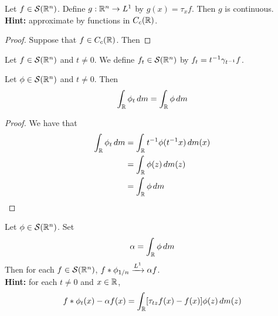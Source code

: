 \documentclass{book}
\begin{document}
	\begin{ex}
		Let $f \in \mathcal{S}(\mathbb{R}^n)$. Define $g: \mathbb{R}^n \rightarrow L^1$ by $g(x) = \tau_x f$. Then $g$ is continuous. \\
		\textbf{Hint:} approximate by functions in $C_c(\mathbb{R})$.
	\end{ex}

	\begin{proof}
		Suppose that $f \in C_c(\mathbb{R})$. Then
	\end{proof}

	\begin{defn}
		Let $f \in \mathcal{S}(\mathbb{R}^n)$ and $t \neq 0$. We define $f_t \in \mathcal{S}(\mathbb{R}^n)$ by $f_t = t^{-1} \gamma_{t^{-1}} f$.   
	\end{defn}

	\begin{ex}
		Let $\phi \in \mathcal{S}(\mathbb{R}^n)$ and $t \neq 0$. Then 
		$$\int_{\mathbb{R}}\phi_t \, d m = \int_{\mathbb{R}} \phi \, d m$$ 
	\end{ex}

	\begin{proof}
		We have that 
		\begin{align*}
			\int_{\mathbb{R}}\phi_t \, d m 
			& = \int_{\mathbb{R}}t^{-1}\phi(t^{-1}x) \, d m(x) \\
			& = \int_{\mathbb{R}} \phi(z) \, d m(z) \\
			& = \int_{\mathbb{R}}\phi \, d m 
		\end{align*}
	\end{proof}

	\begin{ex}
		Let $\phi \in \mathcal{S}(\mathbb{R}^n)$. Set 
		$$\alpha = \int_{\mathbb{R}} \phi \, d m$$ 
		Then for each $f \in \mathcal{S}(\mathbb{R}^n)$,  $f * \phi_{1/n} \xrightarrow{L^1} \alpha f$. \\
		\textbf{Hint:} for each $t \neq 0$ and $x \in \mathbb{R}$, 
		$$f * \phi_t(x) - \alpha f(x) = \int_{\mathbb{R}} [\tau_{tz}f(x)  -  f(x)] \phi(z) \, d m(z) $$
	\end{ex}
\end{document}
